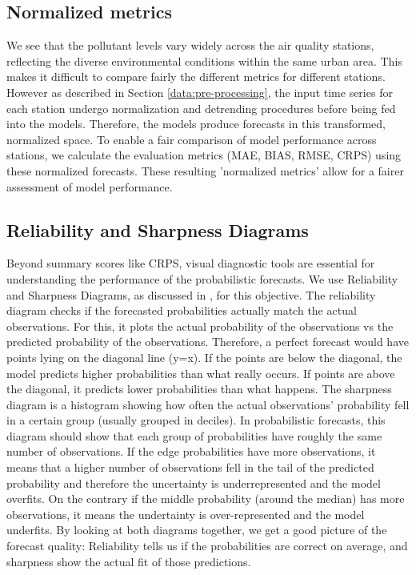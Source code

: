 \documentclass[12pt,a4paper]{book}
\begin{document}
\subsection{Normalized metrics}
We see that the pollutant levels vary widely across the air quality stations, reflecting the diverse environmental conditions within the same urban area. This makes it difficult to compare fairly the different metrics for different stations. However as described in Section \ref{data:pre-processing}, the input time series for each station undergo normalization and detrending procedures before being fed into the models. Therefore, the models produce forecasts in this transformed, normalized space. To enable a fair comparison of model performance across stations, we calculate the evaluation metrics (MAE, BIAS, RMSE, CRPS) using these normalized forecasts. These resulting 'normalized metrics' allow for a fairer assessment of model performance.

\subsection{Reliability and Sharpness Diagrams}
Beyond summary scores like CRPS, visual diagnostic tools are essential for understanding the performance of the probabilistic forecasts. We use Reliability and Sharpness Diagrams, as discussed in \cite{gneiting_probabilistic_2007}, for this objective. The reliability diagram checks if the forecasted probabilities actually match the actual observations. For this, it plots the actual probability of the observations vs the predicted probability of the observations. Therefore, a perfect forecast would have points lying on the diagonal line (y=x). If the points are below the diagonal, the model predicts higher probabilities than what really occurs. If points are above the diagonal, it predicts lower probabilities than what happens. The sharpness diagram is a histogram showing how often the actual observations' probability fell in a certain group (usually grouped in deciles). In probabilistic forecasts, this diagram should show that each group of probabilities have roughly the same number of observations. If the edge probabilities have more observations, it means that a higher number of observations fell in the tail of the predicted probability and therefore the uncertainty is underrepresented and the model overfits. On the contrary if the middle probability (around the median) has more observations, it means the undertainty is over-represented and the model underfits. By looking at both diagrams together, we get a good picture of the forecast quality: Reliability tells us if the probabilities are correct on average, and sharpness show the actual fit of those predictions.
\end{document}
